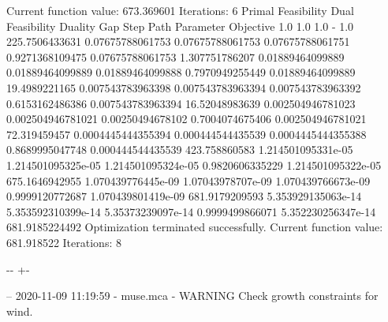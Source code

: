\documentclass[letterpaper,10pt,english]{sphinxmanual}
\newlength\nbsphinxcodecellspacing
\begin{document}
{\begin{sphinxVerbatim}[commandchars=\\\{\}]
         Current function value: 673.369601
         Iterations: 6
Primal Feasibility  Dual Feasibility    Duality Gap         Step             Path Parameter      Objective
1.0                 1.0                 1.0                 -                1.0                 225.7506433631
0.07675788061753    0.07675788061753    0.07675788061751    0.9271368109475  0.07675788061753    1.307751786207
0.01889464099889    0.01889464099889    0.01889464099888    0.7970949255449  0.01889464099889    19.4989221165
0.007543783963398   0.007543783963394   0.007543783963392   0.6153162486386  0.007543783963394   16.52048983639
0.002504946781023   0.002504946781021   0.00250494678102    0.7004074675406  0.002504946781021   72.319459457
0.0004445444355394  0.000444544435539   0.0004445444355388  0.8689995047748  0.000444544435539   423.758860583
1.214501095331e-05  1.214501095325e-05  1.214501095324e-05  0.9820606335229  1.214501095322e-05  675.1646942955
1.070439776445e-09  1.07043978707e-09   1.070439766673e-09  0.9999120772687  1.070439801419e-09  681.9179209593
5.353929135063e-14  5.353592310399e-14  5.35373239097e-14   0.9999499866071  5.352230256347e-14  681.9185224492
Optimization terminated successfully.
         Current function value: 681.918522
         Iterations: 8
\end{sphinxVerbatim}
}

{

\kern-\sphinxverbatimsmallskipamount\kern-\baselineskip
\kern+\FrameHeightAdjust\kern-\fboxrule
\vspace{\nbsphinxcodecellspacing}

\begin{sphinxVerbatim}[commandchars=\\\{\}]
-- 2020-11-09 11:19:59 - muse.mca - WARNING
Check growth constraints for wind.

\end{sphinxVerbatim}
}
\end{document}
